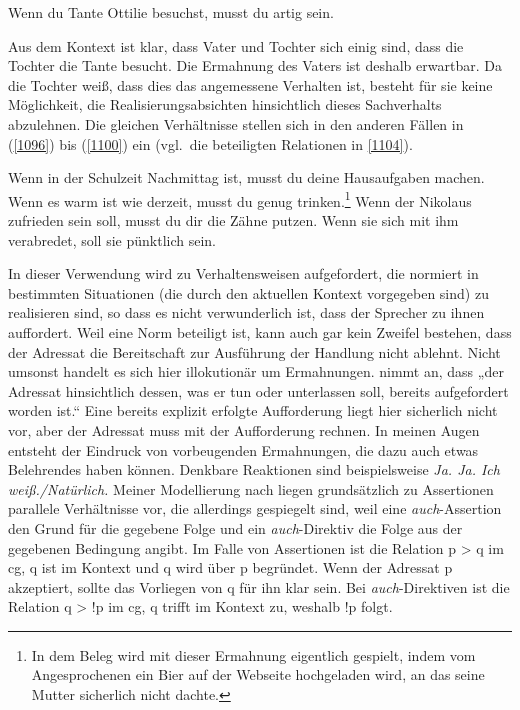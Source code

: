 \begin{exe}
\ex\label{1103} 
	Wenn du Tante Ottilie besuchst, musst du artig sein.
\end{exe}	
Aus dem Kontext ist klar, dass Vater und Tochter sich einig sind, dass die Tochter die Tante besucht. Die Ermahnung des Vaters ist deshalb erwartbar. Da die Tochter weiß, dass dies das angemessene Verhalten ist, besteht für sie keine Möglichkeit, die Realisierungsabsichten hinsichtlich dieses Sachverhalts abzuleh\-nen. Die gleichen Verhältnisse stellen sich in den anderen Fällen in (\ref{1096}) bis (\ref{1100}) ein (vgl.\ die beteiligten Relationen in \ref{1104}).

\begin{exe}
	\ex\label{1104} 
		\begin{xlist}	
			\ex\label{1104a} Wenn in der Schulzeit Nachmittag ist, musst du deine Hausaufgaben machen.
			\ex\label{1104b} Wenn es warm ist wie derzeit, musst du genug trinken.\footnote{In dem Beleg wird mit dieser Ermahnung eigentlich gespielt, 				indem vom Angesprochenen ein Bier auf der Webseite hochgeladen wird, an das seine Mutter sicherlich nicht dachte.}
			\ex\label{1104c} Wenn der Nikolaus zufrieden sein soll, musst du dir die Zähne putzen.
			\ex\label{1104d} Wenn sie sich mit ihm verabredet, soll sie pünktlich sein.
		\end{xlist}
\end{exe}
In dieser Verwendung wird zu Verhaltensweisen aufgefordert, die normiert in bestimmten Situationen (die durch den aktuellen Kontext vorgegeben sind) zu realisieren sind, so dass es nicht verwunderlich ist, dass der Sprecher zu ihnen auffordert. Weil eine Norm beteiligt ist, kann auch gar kein Zweifel bestehen, dass der Adressat die Bereitschaft zur Ausführung der Handlung nicht ablehnt. Nicht umsonst handelt es sich hier illokutionär  um Ermahnungen. \citet[179]{Rolf1997} nimmt an, dass „der Adressat hinsichtlich dessen, was er tun oder unterlassen soll, bereits aufgefordert worden ist.“ Eine bereits explizit erfolgte Aufforderung liegt hier sicherlich nicht vor, aber der Adressat muss mit der Aufforderung rechnen. In meinen Augen entsteht der Eindruck von vorbeugenden Ermahnungen, die dazu auch etwas Belehrendes haben können. Denkbare Reaktionen sind beispielsweise \textit{Ja. Ja. Ich weiß./Natürlich.} Meiner Modellierung nach liegen grundsätzlich zu Assertionen parallele Verhältnisse vor, die aller\-dings gespiegelt sind, weil eine \textit{auch}-Assertion den Grund für die gegebene Folge und ein \textit{auch}-Direktiv die Folge aus der gegebenen Bedingung angibt. Im Falle von Assertionen ist die Relation p > q im cg, q ist im Kontext und q wird über p begründet. Wenn der Adressat p akzeptiert, sollte das Vorliegen von q für ihn klar sein. Bei \textit{auch}-Direktiven ist die Relation q > !p im cg, q trifft im Kontext zu, weshalb !p folgt.

